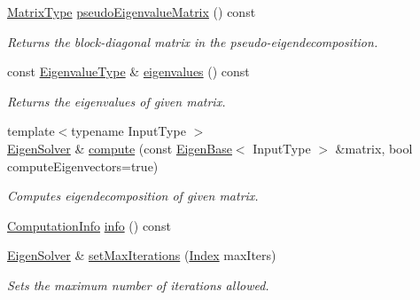 \begin{DoxyCompactItemize}
\hyperlink{group___eigenvalues___module_a83acd180404ddaac8a678fa65a6b632b}{Matrix\+Type} \hyperlink{group___eigenvalues___module_a4979eafe0aeef06b19ada7fa5e19db17}{pseudo\+Eigenvalue\+Matrix} () const
\begin{DoxyCompactList}\small\item\em Returns the block-\/diagonal matrix in the pseudo-\/eigendecomposition. \end{DoxyCompactList}\item 
const \hyperlink{group___eigenvalues___module_adc446bcb60572758fa64515f2825db62}{Eigenvalue\+Type} \& \hyperlink{group___eigenvalues___module_a114189009e42f5e03372a7a3dfa33b97}{eigenvalues} () const
\begin{DoxyCompactList}\small\item\em Returns the eigenvalues of given matrix. \end{DoxyCompactList}\item 
{\footnotesize template$<$typename Input\+Type $>$ }\\\hyperlink{group___eigenvalues___module_class_eigen_1_1_eigen_solver}{Eigen\+Solver} \& \hyperlink{group___eigenvalues___module_a38d032b75b3e75640e3db42e7ab20c24}{compute} (const \hyperlink{group___core___module_struct_eigen_1_1_eigen_base}{Eigen\+Base}$<$ Input\+Type $>$ \&matrix, bool compute\+Eigenvectors=true)
\begin{DoxyCompactList}\small\item\em Computes eigendecomposition of given matrix. \end{DoxyCompactList}\item 
\hyperlink{group__enums_ga85fad7b87587764e5cf6b513a9e0ee5e}{Computation\+Info} \hyperlink{group___eigenvalues___module_ac4af54fadc33abcdd1778c87bfbf005b}{info} () const
\item 
\mbox{\label{group___eigenvalues___module_a6cff220aadfd8d8c1366b915ddefd164}} 
\hyperlink{group___eigenvalues___module_class_eigen_1_1_eigen_solver}{Eigen\+Solver} \& \hyperlink{group___eigenvalues___module_a6cff220aadfd8d8c1366b915ddefd164}{set\+Max\+Iterations} (\hyperlink{group___eigenvalues___module_a5bff6a6bc0efac67d52c60c2c3deb9ee}{Index} max\+Iters)
\begin{DoxyCompactList}\small\item\em Sets the maximum number of iterations allowed. \end{DoxyCompactList}\item 
\mbox{\label{group___eigenvalues___module_aa7668af4bcb47cd92cfe10640589d88f}} 

\end{DoxyCompactItemize}
